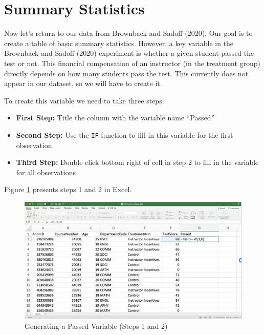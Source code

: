 \documentclass[
]{book}
\begin{document}
\hypertarget{summary-statistics}{%
\section{Summary Statistics}\label{summary-statistics}}

Now let's return to our data from Brownback and Sadoff (2020). Our goal is to create a table of basic summary statistics. However, a key variable in the Brownback and Sadoff (2020) experiment is whether a given student passed the test or not. This financial compensation of an instructor (in the treatment group) directly depends on how many students pass the test. This currently does not appear in our dataset, so we will have to create it.

To create this variable we need to take three steps:

\begin{itemize}
\item
  \textbf{First Step:} Title the column with the variable name ``Passed''
\item
  \textbf{Second Step:} Use the \texttt{IF} function to fill in this variable for the first observation
\item
  \textbf{Third Step:} Double click bottom right of cell in step 2 to fill in the variable for all observations
\end{itemize}

Figure \ref{fig:passed1} presents steps 1 and 2 in Excel.

\begin{figure}

{\centering \includegraphics[width=1\linewidth]{images/01_passed1} 

}

\caption{Generating a Passed Variable (Steps 1 and 2)}\label{fig:passed1}
\end{figure}
\end{document}
